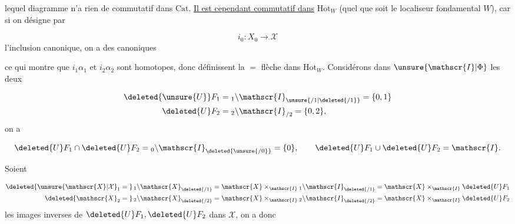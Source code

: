 lequel diagramme n'a rien de commutatif dans $\mathrm{Cat}$. \uline{Il est cependant commutatif dans} $\mathrm{Hot}_W$ (quel que soit le localiseur fondamental $W$),  car si on désigne par

\[
i_0:X_0\longrightarrow\mathscr{X}
\]
l'inclusion canonique, on a des  canoniques

ce qui montre que $i_1\alpha_1$ et $i_2\alpha_2$ sont homotopes, donc définissent la $=$ flèche dans $\mathrm{Hot}_W$.
Considérons dans $\unsure{\mathscr{I}|\Phi}$ les deux  

\[
\begin{aligned}
\deleted{\unsure{U}}F_1&={}_1\backslash\mathscr{I}_{\unsure{/1|\deleted{/1}}}=\{0,1\}\\
\deleted{U}F_2&={}_2\backslash\mathscr{I}_{/2}=\{0,2\},
\end{aligned}
\]
on a

\[
\deleted{U}F_1\cap\deleted{U}F_2={}_0\backslash\mathscr{I}_{\deleted{\unsure{/0}}}=\{0\},\qquad
\deleted{U}F_1\cup\deleted{U}F_2=\mathscr{I}.
\]

Soient

\[
\begin{aligned}
\deleted{\unsure{\mathscr{X}|\mathcal X}_1={}}\,{}_1\backslash\mathscr{X}_{\deleted{/1}}&=\mathscr{X}\times_{\mathscr{I}}{}_1\backslash\mathscr{I}_{\deleted{/1}}=\mathscr{X}\times_{\mathscr{I}}\deleted{U}F_1\\
\deleted{\mathscr{X}_2={}}\,{}_2\backslash\mathscr{X}_{\deleted{/2}}&=\mathscr{X}\times_{\mathscr{I}}{}_2\backslash\mathscr{I}_{\deleted{/2}}=\mathscr{X}\times_{\mathscr{I}}\deleted{U}F_2
\end{aligned}
\]
les images inverses de $\deleted{U}F_1,\deleted{U}F_2$ dans $\mathscr{X}$, on a donc

